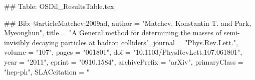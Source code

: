 ## Table:
OSDil_ResultsTable.tex

## Bib:
@article{Matchev:2009ad,
      author         = "Matchev, Konstantin T. and Park, Myeonghun",
      title          = "{A General method for determining the masses of
                        semi-invisibly decaying particles at hadron colliders}",
      journal        = "Phys.Rev.Lett.",
      volume         = "107",
      pages          = "061801",
      doi            = "10.1103/PhysRevLett.107.061801",
      year           = "2011",
      eprint         = "0910.1584",
      archivePrefix  = "arXiv",
      primaryClass   = "hep-ph",
      SLACcitation   = "%
}
